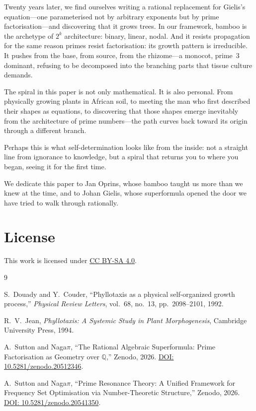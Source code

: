 \documentclass[11pt,a4paper]{article}
\begin{document}
Twenty years later, we find ourselves writing a rational replacement for Gielis's equation---one parameterised not by arbitrary exponents but by prime factorisation---and discovering that it grows trees. In our framework, bamboo is the archetype of $2^k$ architecture: binary, linear, nodal. And it resists propagation for the same reason primes resist factorisation: its growth pattern is irreducible. It pushes from the base, from source, from the rhizome---a monocot, prime~3 dominant, refusing to be decomposed into the branching parts that tissue culture demands.

The spiral in this paper is not only mathematical. It is also personal. From physically growing plants in African soil, to meeting the man who first described their shapes as equations, to discovering that those shapes emerge inevitably from the architecture of prime numbers---the path curves back toward its origin through a different branch.

Perhaps this is what self-determination looks like from the inside: not a straight line from ignorance to knowledge, but a spiral that returns you to where you began, seeing it for the first time.

We dedicate this paper to Jan Oprins, whose bamboo taught us more than we knew at the time, and to Johan Gielis, whose superformula opened the door we have tried to walk through rationally.

\section*{License}

This work is licensed under \href{https://creativecommons.org/licenses/by-sa/4.0/}{CC BY-SA 4.0}.

\begin{thebibliography}{9}

S.~Douady and Y.~Couder,
``Phyllotaxis as a physical self-organized growth process,''
\textit{Physical Review Letters}, vol.~68, no.~13, pp.~2098--2101, 1992.

R.~V.~Jean,
\textit{Phyllotaxis: A Systemic Study in Plant Morphogenesis},
Cambridge University Press, 1994.

A.~Sutton and Naga$\pi$,
``The Rational Algebraic Superformula: Prime Factorisation as Geometry over $\mathbb{Q}$,''
Zenodo, 2026.
\href{https://doi.org/10.5281/zenodo.20512346}{DOI: 10.5281/zenodo.20512346}.

A.~Sutton and Naga$\pi$,
``Prime Resonance Theory: A Unified Framework for Frequency Set Optimisation via Number-Theoretic Structure,''
Zenodo, 2026.
\href{https://doi.org/10.5281/zenodo.20541350}{DOI: 10.5281/zenodo.20541350}.

\end{thebibliography}
\end{document}
